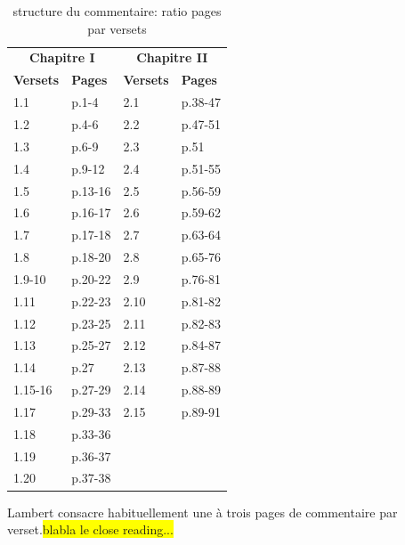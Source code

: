 \documentclass[11pt,french]{article}
\begin{document}
\begin{table}[h]
    \small
    \centering
    \begin{tabular}{ll|ll}
        \toprule
        \multicolumn{2}{c}{\textbf{Chapitre I}} & \multicolumn{2}{c}{\textbf{Chapitre II}}\\
        \textbf{Versets} & \textbf{Pages} & \textbf{Versets} & \textbf{Pages}\\
        \midrule
        1.1 & p.1-4 & 2.1 & p.38-47 \\
        1.2 & p.4-6 & 2.2 & p.47-51\\
        1.3 & p.6-9 & 2.3 & p.51\\
        1.4 & p.9-12 & 2.4 & p.51-55\\
        1.5 & p.13-16 & 2.5 & p.56-59 \\
        1.6 & p.16-17 & 2.6 & p.59-62\\
        1.7 & p.17-18 & 2.7 & p.63-64\\
        1.8 & p.18-20 & 2.8 & p.65-76\\
        1.9-10 & p.20-22 & 2.9 & p.76-81\\
        1.11 & p.22-23 & 2.10 & p.81-82\\
        1.12 & p.23-25 & 2.11 & p.82-83\\
        1.13 & p.25-27 & 2.12 & p.84-87\\
        1.14 & p.27 & 2.13 & p.87-88\\
        1.15-16 & p.27-29 & 2.14 & p.88-89\\
        1.17 & p.29-33 & 2.15 & p.89-91\\
        1.18 & p.33-36 & {} & {}\\
        1.19 & p.36-37 & {} & {}\\
        1.20 & p.37-38 & {} & {}\\
        \bottomrule
    \end{tabular}
    \caption{structure du commentaire: ratio pages par versets}
\end{table}
Lambert consacre habituellement une à trois pages de commentaire par verset.\colorbox{yellow}{blabla le close reading...}\par

\end{document}
